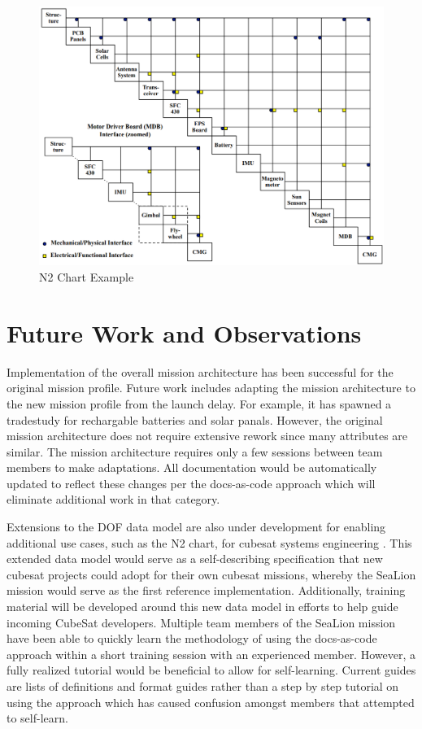\documentclass[journal,article,submit,pdftex,moreauthors]{Definitions/mdpi}
\begin{document}
\begin{figure}[H]
    \includegraphics[width=13.75 cm]{assets/N2.png}
    \caption{N2 Chart Example}
	\label{fig:N2}
    \end{figure}   
\unskip

\section{Future Work and Observations}
Implementation of the overall mission architecture has been successful for the original mission profile.  Future work includes adapting the mission architecture to the new mission profile from the launch delay.  For example, it has spawned a tradestudy for rechargable batteries and solar panals.  However, the original mission architecture does not require extensive rework since many attributes are similar.  The mission architecture requires only a few sessions between team members to make adaptations.  All documentation would be automatically updated to reflect these changes per the docs-as-code approach which will eliminate additional work in that category.

Extensions to the DOF data model are also under development for enabling additional use cases, such as the N2 chart, for cubesat systems engineering \cite{sealion_dof}.  This extended data model would serve as a self-describing specification that new cubesat projects could adopt for their own cubesat missions, whereby the SeaLion mission would serve as the first reference implementation.  Additionally, training material will be developed around this new data model in efforts to help guide incoming CubeSat developers.  Multiple team members of the SeaLion mission have been able to quickly learn the methodology of using the docs-as-code approach within a short training session with an experienced member.  However, a fully realized tutorial would be beneficial to allow for self-learning.  Current guides are lists of definitions and format guides rather than a step by step tutorial on using the approach which has caused confusion amongst members that attempted to self-learn.
\end{document}
